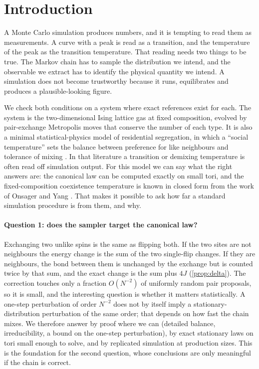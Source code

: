 \section{Introduction}
A Monte Carlo simulation produces numbers, and it is tempting to read them as measurements. A curve with a peak is read as a transition, and the temperature of the peak as the transition temperature. That reading needs two things to be true. The Markov chain has to sample the distribution we intend, and the observable we extract has to identify the physical quantity we intend. A simulation does not become trustworthy because it runs, equilibrates and produces a plausible-looking figure.

We check both conditions on a system where exact references exist for each. The system is the two-dimensional Ising lattice gas at fixed composition, evolved by pair-exchange Metropolis moves that conserve the number of each type. It is also a minimal statistical-physics model of residential segregation, in which a ``social temperature'' sets the balance between preference for like neighbours and tolerance of mixing \citep{schelling1971,vinkovic2006,stauffer2007,dallasta2008,gauvin2009}. In that literature a transition or demixing temperature is often read off simulation output. For this model we can say what the right answers are: the canonical law can be computed exactly on small tori, and the fixed-composition coexistence temperature is known in closed form from the work of Onsager and Yang \citep{onsager1944,yang1952}. That makes it possible to ask how far a standard simulation procedure is from them, and why.

\paragraph{Question 1: does the sampler target the canonical law?}
Exchanging two unlike spins is the same as flipping both. If the two sites are not neighbours the energy change is the sum of the two single-flip changes. If they are neighbours, the bond between them is unchanged by the exchange but is counted twice by that sum, and the exact change is the sum plus $4J$ (\cref{prop:delta}). The correction touches only a fraction $O(N^{-2})$ of uniformly random pair proposals, so it is small, and the interesting question is whether it matters statistically. A one-step perturbation of order $N^{-2}$ does not by itself imply a stationary-distribution perturbation of the same order; that depends on how fast the chain mixes. We therefore answer by proof where we can (detailed balance, irreducibility, a bound on the one-step perturbation), by exact stationary laws on tori small enough to solve, and by replicated simulation at production sizes. This is the foundation for the second question, whose conclusions are only meaningful if the chain is correct.

